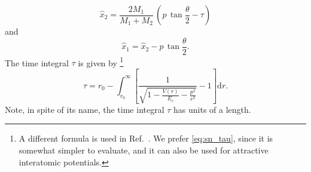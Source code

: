 %
\begin{equation}
    \label{eq:sn_recoil_turning}
    \hat{x}_2 = \frac{ 2 M_1 }{ M_1 + M_2 } \, (p \, \tan \frac{\theta}{2} - \tau)
\end{equation}
%
and
%
\begin{equation}
    \label{eq:sn_proj_turning}
    \hat{x}_1 = \hat{x}_2 - p \, \tan \frac{\theta}{2}.
\end{equation}
%
The time integral $\tau$ is given by \cite{Rob97}%
%
\footnote{
    A different formula is used in Ref.~\cite{Eck91}. We prefer \cref{eq:sn_tau}, since it is somewhat simpler to evaluate, and it can also be used for attractive interatomic potentials.
}
%
\begin{equation}
    \label{eq:sn_tau}
    \tau = r_0 - \int_{r_0}^\infty \left[
        \frac{ 1 }{ \sqrt{ 1 - \frac{ V(r) }{ E_\mathrm{c} }
                - \frac{ p^2 }{ r^2 } } }
        - 1 \right] \mathrm{d}r.
\end{equation}
%
Note, in spite of its name, the time integral $\tau$ has units of a length.


